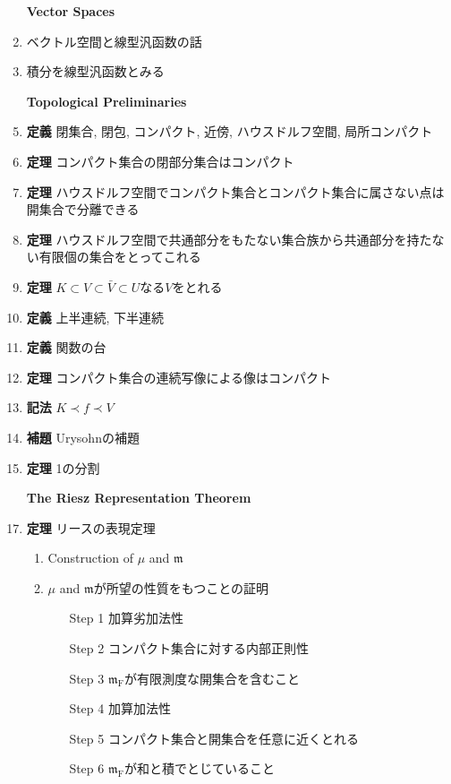 \documentclass[a4paper,18pt]{jsarticle}
\begin{document}
\begin{enumerate}
  \item[] \hspace{-8mm}\textbf{Vector Spaces}
  \item ベクトル空間と線型汎函数の話
  \item 積分を線型汎函数とみる
  \item[] \hspace{-8mm}\textbf{Topological Preliminaries}
  \item \textbf{定義} 閉集合, 閉包, コンパクト, 近傍, ハウスドルフ空間, 局所コンパクト
  \item \textbf{定理} コンパクト集合の閉部分集合はコンパクト
  \item \textbf{定理} ハウスドルフ空間でコンパクト集合とコンパクト集合に属さない点は開集合で分離できる
  \item \textbf{定理} ハウスドルフ空間で共通部分をもたない集合族から共通部分を持たない有限個の集合をとってこれる
  \item \textbf{定理} $K \subset V \subset \bar{V} \subset U$なる$V$をとれる
  \item \textbf{定義} 上半連続, 下半連続
  \item \textbf{定義} 関数の台
  \item \textbf{定理} コンパクト集合の連続写像による像はコンパクト
  \item \textbf{記法} $K\prec f \prec V$
  \item \textbf{補題} Urysohnの補題
  \item \textbf{定理} 1の分割
  \item[] \hspace{-8mm}\textbf{The Riesz Representation Theorem}
  \item \textbf{定理} リースの表現定理
  \begin{enumerate}
    \item Construction of $\mu$ and $\mathfrak{m}$
    \item $\mu$ and $\mathfrak{m}$が所望の性質をもつことの証明
    \begin{enumerate}
      \item[Step 1 ] 加算劣加法性
      \item[Step 2 ] コンパクト集合に対する内部正則性
      \item[Step 3 ] $\mathfrak{m}_{\mathrm{F}}$が有限測度な開集合を含むこと
      \item[Step 4 ] 加算加法性
      \item[Step 5 ] コンパクト集合と開集合を任意に近くとれる
      \item[Step 6 ] $\mathfrak{m}_{\mathrm{F}}$が和と積でとじていること

\end{enumerate}
\end{enumerate}
\end{enumerate}
\end{document}
